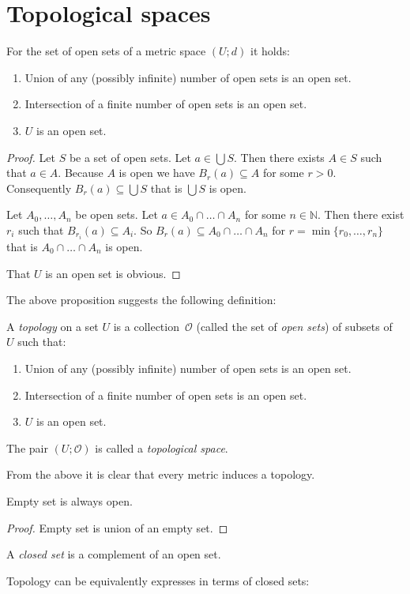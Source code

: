 \section{\label{sec-top}Topological spaces}
\begin{prop}
For the set of open sets of a metric space $(U;d)$ it holds:
\begin{enumerate}
\item Union of any (possibly infinite) number of open sets is an open set.
\item Intersection of a finite number of open sets is an open set.
\item $U$ is an open set.
\end{enumerate}
\end{prop}
\begin{proof}
Let $S$ be a set of open sets. Let $a\in\bigcup S$. Then there exists
$A\in S$ such that $a\in A$. Because $A$ is open we have $B_{r}(a)\subseteq A$
for some $r>0$. Consequently $B_{r}(a)\subseteq\bigcup S$ that is
$\bigcup S$ is open.

Let $A_{0},\dots,A_{n}$ be open sets. Let $a\in A_{0}\cap\dots\cap A_{n}$
for some $n\in\mathbb{N}$. Then there exist $r_{i}$ such that $B_{r_{i}}(a)\subseteq A_{i}$.
So $B_{r}(a)\subseteq A_{0}\cap\dots\cap A_{n}$ for $r=\min\{r_{0},\dots,r_{n}\}$
that is $A_{0}\cap\dots\cap A_{n}$ is open.

That $U$ is an open set is obvious.
\end{proof}
The above proposition suggests the following definition:
\begin{defn}
A \emph{topology} on a set $U$ is a collection~$\mathcal{O}$
(called the set of \emph{open sets}) of subsets of~$U$ such that:
\begin{enumerate}
\item Union of any (possibly infinite) number of open sets is an open set.
\item Intersection of a finite number of open sets is an open set.
\item $U$ is an open set.
\end{enumerate}
The pair $(U;\mathcal{O})$ is called a
\emph{topological space}.\end{defn}
\begin{rem}
From the above it is clear that every metric induces a topology.\end{rem}
\begin{prop}
Empty set is always open.\end{prop}
\begin{proof}
Empty set is union of an empty set.\end{proof}
\begin{defn}
A \emph{closed set} is a complement of an open
set.
\end{defn}
Topology can be equivalently expresses in terms of closed sets:

